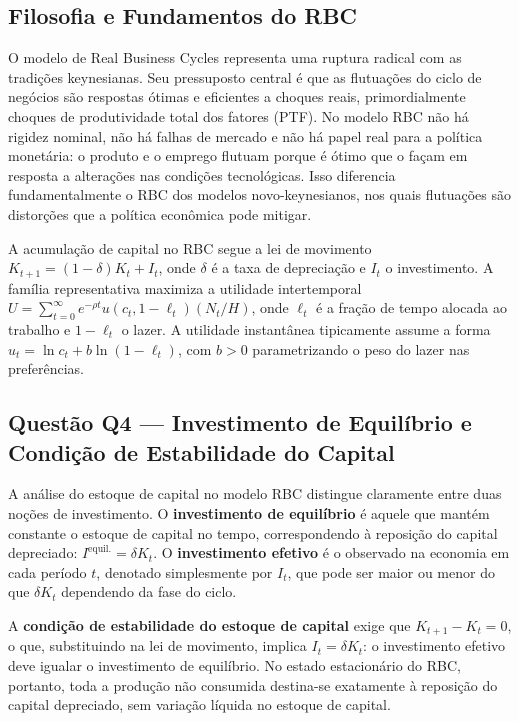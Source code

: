 \documentclass[12pt, a4paper]{article}
\begin{document}
\subsection{Filosofia e Fundamentos do RBC}

O modelo de Real Business Cycles representa uma ruptura radical com as tradições keynesianas. Seu pressuposto central é que as flutuações do ciclo de negócios são respostas ótimas e eficientes a choques reais, primordialmente choques de produtividade total dos fatores (PTF). No modelo RBC não há rigidez nominal, não há falhas de mercado e não há papel real para a política monetária: o produto e o emprego flutuam porque é ótimo que o façam em resposta a alterações nas condições tecnológicas. Isso diferencia fundamentalmente o RBC dos modelos novo-keynesianos, nos quais flutuações são distorções que a política econômica pode mitigar.

A acumulação de capital no RBC segue a lei de movimento $K_{t+1} = (1-\delta)K_t + I_t$, onde $\delta$ é a taxa de depreciação e $I_t$ o investimento. A família representativa maximiza a utilidade intertemporal $U = \sum_{t=0}^\infty e^{-\rho t}u(c_t, 1-\ell_t)(N_t/H)$, onde $\ell_t$ é a fração de tempo alocada ao trabalho e $1-\ell_t$ o lazer. A utilidade instantânea tipicamente assume a forma $u_t = \ln c_t + b\ln(1-\ell_t)$, com $b > 0$ parametrizando o peso do lazer nas preferências.

\subsection{Questão Q4 --- Investimento de Equilíbrio e Condição de Estabilidade do Capital}

A análise do estoque de capital no modelo RBC distingue claramente entre duas noções de investimento. O \textbf{investimento de equilíbrio} é aquele que mantém constante o estoque de capital no tempo, correspondendo à reposição do capital depreciado: $I^{\text{equil.}} = \delta K_t$. O \textbf{investimento efetivo} é o observado na economia em cada período $t$, denotado simplesmente por $I_t$, que pode ser maior ou menor do que $\delta K_t$ dependendo da fase do ciclo.

A \textbf{condição de estabilidade do estoque de capital} exige que $K_{t+1} - K_t = 0$, o que, substituindo na lei de movimento, implica $I_t = \delta K_t$: o investimento efetivo deve igualar o investimento de equilíbrio. No estado estacionário do RBC, portanto, toda a produção não consumida destina-se exatamente à reposição do capital depreciado, sem variação líquida no estoque de capital.
\end{document}
